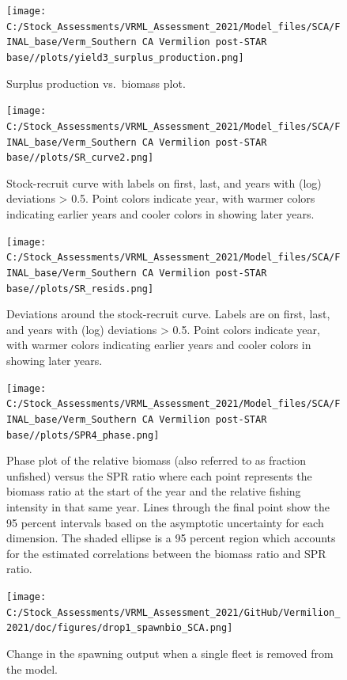 \documentclass[
  english,
  a4paper,
]{article}
\begin{document}
\begin{figure}
\centering
\texttt{[image: C:/Stock\_Assessments/VRML\_Assessment\_2021/Model\_files/SCA/FINAL\_base/Verm\_Southern CA Vermilion post-STAR base//plots/yield3\_surplus\_production.png]}
\caption{Surplus production vs.~biomass plot.\label{fig:yield3}}
\end{figure}

\begin{figure}
\centering
\texttt{[image: C:/Stock\_Assessments/VRML\_Assessment\_2021/Model\_files/SCA/FINAL\_base/Verm\_Southern CA Vermilion post-STAR base//plots/SR\_curve2.png]}
\caption{Stock-recruit curve with labels on first, last, and years with (log) deviations \textgreater{} 0.5. Point colors indicate year, with warmer colors indicating earlier years and cooler colors in showing later years.\label{fig:bh-curve}}
\end{figure}

\begin{figure}
\centering
\texttt{[image: C:/Stock\_Assessments/VRML\_Assessment\_2021/Model\_files/SCA/FINAL\_base/Verm\_Southern CA Vermilion post-STAR base//plots/SR\_resids.png]}
\caption{Deviations around the stock-recruit curve. Labels are on first, last, and years with (log) deviations \textgreater{} 0.5. Point colors indicate year, with warmer colors indicating earlier years and cooler colors in showing later years.\label{fig:bh-resids}}
\end{figure}

\FloatBarrier

\begin{figure}
\centering
\texttt{[image: C:/Stock\_Assessments/VRML\_Assessment\_2021/Model\_files/SCA/FINAL\_base/Verm\_Southern CA Vermilion post-STAR base//plots/SPR4\_phase.png]}
\caption{Phase plot of the relative biomass (also referred to as fraction unfished) versus the SPR ratio where each point represents the biomass ratio at the start of the year and the relative fishing intensity in that same year. Lines through the final point show the 95 percent intervals based on the asymptotic uncertainty for each dimension. The shaded ellipse is a 95 percent region which accounts for the estimated correlations between the biomass ratio and SPR ratio.\label{fig:phase}}
\end{figure}

\FloatBarrier

\begin{figure}
\centering
\texttt{[image: C:/Stock\_Assessments/VRML\_Assessment\_2021/GitHub/Vermilion\_2021/doc/figures/drop1\_spawnbio\_SCA.png]}
\caption{Change in the spawning output when a single fleet is removed from the model.\label{fig:drop-spawnbio}}
\end{figure}
\end{document}
